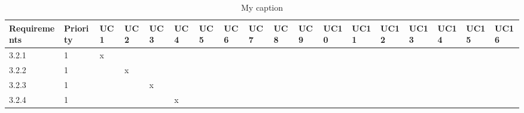 \documentclass[runningheads,a4paper]{article}
\begin{document}
\begin{table}[]
\centering
\caption{My caption}
\label{my-label}
\begin{tabular}{llllllllllllllllll}
\hline
\multicolumn{1}{|l|}{Requirements} & \multicolumn{1}{l|}{Priority} & \multicolumn{1}{l|}{UC1} & \multicolumn{1}{l|}{UC2} & \multicolumn{1}{l|}{UC3} & \multicolumn{1}{l|}{UC4} & \multicolumn{1}{l|}{UC5} & \multicolumn{1}{l|}{UC6} & \multicolumn{1}{l|}{UC7} & \multicolumn{1}{l|}{UC8} & \multicolumn{1}{l|}{UC9} & \multicolumn{1}{l|}{UC10} & \multicolumn{1}{l|}{UC11} & \multicolumn{1}{l|}{UC12} & \multicolumn{1}{l|}{UC13} & \multicolumn{1}{l|}{UC14} & \multicolumn{1}{l|}{UC15} & \multicolumn{1}{l|}{UC16} \\ \hline
\multicolumn{1}{|l|}{3.2.1}        & \multicolumn{1}{l|}{1}        & \multicolumn{1}{l|}{x}   & \multicolumn{1}{l|}{}    & \multicolumn{1}{l|}{}    & \multicolumn{1}{l|}{}    & \multicolumn{1}{l|}{}    & \multicolumn{1}{l|}{}    & \multicolumn{1}{l|}{}    & \multicolumn{1}{l|}{}    & \multicolumn{1}{l|}{}    & \multicolumn{1}{l|}{}     & \multicolumn{1}{l|}{}     & \multicolumn{1}{l|}{}     & \multicolumn{1}{l|}{}     & \multicolumn{1}{l|}{}     & \multicolumn{1}{l|}{}     & \multicolumn{1}{l|}{}     \\ \hline
\multicolumn{1}{|l|}{3.2.2}        & \multicolumn{1}{l|}{1}        & \multicolumn{1}{l|}{}    & \multicolumn{1}{l|}{x}   & \multicolumn{1}{l|}{}    & \multicolumn{1}{l|}{}    & \multicolumn{1}{l|}{}    & \multicolumn{1}{l|}{}    & \multicolumn{1}{l|}{}    & \multicolumn{1}{l|}{}    & \multicolumn{1}{l|}{}    & \multicolumn{1}{l|}{}     & \multicolumn{1}{l|}{}     & \multicolumn{1}{l|}{}     & \multicolumn{1}{l|}{}     & \multicolumn{1}{l|}{}     & \multicolumn{1}{l|}{}     & \multicolumn{1}{l|}{}     \\ \hline
\multicolumn{1}{|l|}{3.2.3}        & \multicolumn{1}{l|}{1}        & \multicolumn{1}{l|}{}    & \multicolumn{1}{l|}{}    & \multicolumn{1}{l|}{x}   & \multicolumn{1}{l|}{}    & \multicolumn{1}{l|}{}    & \multicolumn{1}{l|}{}    & \multicolumn{1}{l|}{}    & \multicolumn{1}{l|}{}    & \multicolumn{1}{l|}{}    & \multicolumn{1}{l|}{}     & \multicolumn{1}{l|}{}     & \multicolumn{1}{l|}{}     & \multicolumn{1}{l|}{}     & \multicolumn{1}{l|}{}     & \multicolumn{1}{l|}{}     & \multicolumn{1}{l|}{}     \\ \hline
\multicolumn{1}{|l|}{3.2.4}        & \multicolumn{1}{l|}{1}        & \multicolumn{1}{l|}{}    & \multicolumn{1}{l|}{}    & \multicolumn{1}{l|}{}    & \multicolumn{1}{l|}{x}   & \multicolumn{1}{l|}{}    & \multicolumn{1}{l|}{}    & \multicolumn{1}{l|}{}    & \multicolumn{1}{l|}{}    & \multicolumn{1}{l|}{}    & \multicolumn{1}{l|}{}     & \multicolumn{1}{l|}{}     & \multicolumn{1}{l|}{}     & \multicolumn{1}{l|}{}     & \multicolumn{1}{l|}{}     & \multicolumn{1}{l|}{}     & \multicolumn{1}{l|}{}     \\ \hline

\end{tabular}
\end{table}
\end{document}
